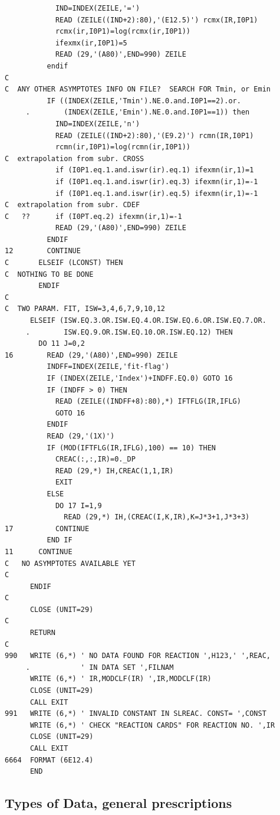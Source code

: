 \documentclass[12pt,dvips]{article}
\begin{document}
\begin{small}
\begin{verbatim}
            IND=INDEX(ZEILE,'=')
            READ (ZEILE((IND+2):80),'(E12.5)') rcmx(IR,I0P1)
            rcmx(ir,I0P1)=log(rcmx(ir,I0P1))
            ifexmx(ir,I0P1)=5
            READ (29,'(A80)',END=990) ZEILE
          endif
C
C  ANY OTHER ASYMPTOTES INFO ON FILE?  SEARCH FOR Tmin, or Emin
          IF ((INDEX(ZEILE,'Tmin').NE.0.and.I0P1==2).or.
     .        (INDEX(ZEILE,'Emin').NE.0.and.I0P1==1)) then
            IND=INDEX(ZEILE,'n')
            READ (ZEILE((IND+2):80),'(E9.2)') rcmn(IR,I0P1)
            rcmn(ir,I0P1)=log(rcmn(ir,I0P1))
C  extrapolation from subr. CROSS
            if (I0P1.eq.1.and.iswr(ir).eq.1) ifexmn(ir,1)=1
            if (I0P1.eq.1.and.iswr(ir).eq.3) ifexmn(ir,1)=-1
            if (I0P1.eq.1.and.iswr(ir).eq.5) ifexmn(ir,1)=-1
C  extrapolation from subr. CDEF
C   ??      if (I0PT.eq.2) ifexmn(ir,1)=-1
            READ (29,'(A80)',END=990) ZEILE
          ENDIF
12        CONTINUE
C       ELSEIF (LCONST) THEN
C  NOTHING TO BE DONE
        ENDIF
C
C  TWO PARAM. FIT, ISW=3,4,6,7,9,10,12
      ELSEIF (ISW.EQ.3.OR.ISW.EQ.4.OR.ISW.EQ.6.OR.ISW.EQ.7.OR.
     .        ISW.EQ.9.OR.ISW.EQ.10.OR.ISW.EQ.12) THEN
        DO 11 J=0,2
16        READ (29,'(A80)',END=990) ZEILE
          INDFF=INDEX(ZEILE,'fit-flag')
          IF (INDEX(ZEILE,'Index')+INDFF.EQ.0) GOTO 16
          IF (INDFF > 0) THEN
            READ (ZEILE((INDFF+8):80),*) IFTFLG(IR,IFLG)
            GOTO 16
          ENDIF
          READ (29,'(1X)')
          IF (MOD(IFTFLG(IR,IFLG),100) == 10) THEN
            CREAC(:,:,IR)=0._DP
            READ (29,*) IH,CREAC(1,1,IR)
            EXIT
          ELSE
            DO 17 I=1,9
              READ (29,*) IH,(CREAC(I,K,IR),K=J*3+1,J*3+3)
17          CONTINUE
          END IF
11      CONTINUE
C   NO ASYMPTOTES AVAILABLE YET
C
      ENDIF
C
      CLOSE (UNIT=29)
C
      RETURN
C
990   WRITE (6,*) ' NO DATA FOUND FOR REACTION ',H123,' ',REAC,
     .            ' IN DATA SET ',FILNAM
      WRITE (6,*) ' IR,MODCLF(IR) ',IR,MODCLF(IR)
      CLOSE (UNIT=29)
      CALL EXIT
991   WRITE (6,*) ' INVALID CONSTANT IN SLREAC. CONST= ',CONST
      WRITE (6,*) ' CHECK "REACTION CARDS" FOR REACTION NO. ',IR
      CLOSE (UNIT=29)
      CALL EXIT
6664  FORMAT (6E12.4)
      END
\end{verbatim}\end{small}
\newpage
\subsection*{Types of Data, general prescriptions}\label{sec1.3}
\end{document}
